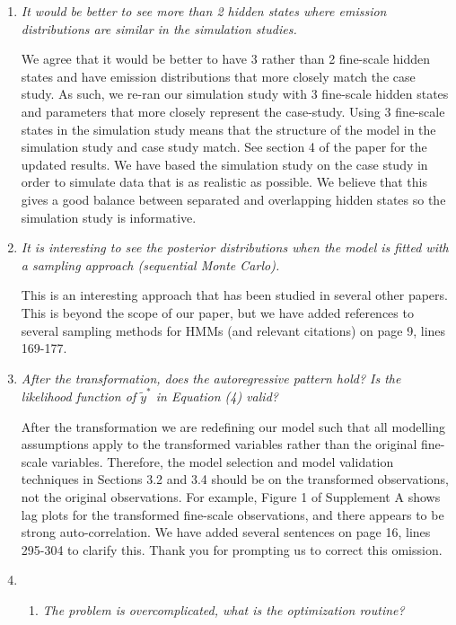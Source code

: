\documentclass{article}
\begin{document}
\begin{enumerate}
\begin{enumerate}
    \end{enumerate}
    
    \item \textit{It would be better to see more than 2 hidden states where emission distributions are similar in the simulation studies.} 
    
    We agree that it would be better to have 3 rather than 2 fine-scale hidden states and have emission distributions that more closely match the case study. As such, we re-ran our simulation study with 3 fine-scale hidden states and parameters that more closely represent the case-study. Using 3 fine-scale states in the simulation study means that the structure of the model in the simulation study and case study match. See section 4 of the paper for the updated results. We have based the simulation study on the case study in order to simulate data that is as realistic as possible. We believe that this gives a good balance between separated and overlapping hidden states so the simulation study is informative.
    
    \item \textit{It is interesting to see the posterior distributions when the model is fitted with a sampling approach (sequential Monte Carlo).} 
    
    This is an interesting approach that has been studied in several other papers. This is beyond the scope of our paper, but we have added references to several sampling methods for HMMs (and relevant citations) on page 9, lines 169-177.
    
    \item \textit{After the transformation, does the autoregressive pattern hold? Is the likelihood function of $\tilde y^*$ in Equation (4) valid?} 
    
    After the transformation we are redefining our model such that all modelling assumptions apply to the transformed variables rather than the original fine-scale variables. Therefore, the model selection and model validation techniques in Sections 3.2 and 3.4 should be on the transformed observations, not the original observations. For example, Figure 1 of Supplement A shows lag plots for the transformed fine-scale observations, and there appears to be strong auto-correlation. We have added several sentences on page 16, lines 295-304 to clarify this. Thank you for prompting us to correct this omission.
    
    \item \begin{enumerate}
        \item \textit{The problem is overcomplicated, what is the optimization routine? } 
        

\end{enumerate}
\end{enumerate}
\end{document}
